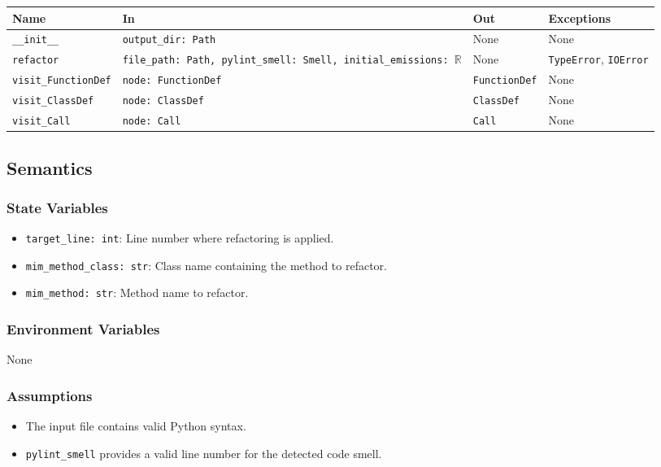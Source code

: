 \documentclass[12pt, titlepage]{article}
\begin{document}
\begin{tabularx}{\linewidth}{|l|>{\raggedright\arraybackslash}X|l|l|}
  \toprule Name & In & Out & Exceptions \\
  \midrule
  \texttt{\_\_init\_\_} & \texttt{output\_dir: Path} & None & None \\
  \hline
  \texttt{refactor} & \texttt{file\_path: Path, pylint\_smell: Smell, initial\_emissions: $\mathbb{R}$} & None & \texttt{TypeError}, \texttt{IOError} \\
  \hline
  \texttt{visit\_FunctionDef} & \texttt{node: FunctionDef} & \texttt{FunctionDef} & None \\
  \hline
  \texttt{visit\_ClassDef} & \texttt{node: ClassDef} & \texttt{ClassDef} & None \\
  \hline
  \texttt{visit\_Call} & \texttt{node: Call} & \texttt{Call} & None \\
  \bottomrule
\end{tabularx}
  
\subsection{Semantics}
  
\subsubsection{State Variables}
\begin{itemize}
  \item \texttt{target\_line: int}: Line number where refactoring is applied.
  \item \texttt{mim\_method\_class: str}: Class name containing the method to refactor.
  \item \texttt{mim\_method: str}: Method name to refactor.
\end{itemize}
  
\subsubsection{Environment Variables}
None
  
\subsubsection{Assumptions}
\begin{itemize}
  \item The input file contains valid Python syntax.
  \item \texttt{pylint\_smell} provides a valid line number for the detected code smell.
\end{itemize}
  
\end{document}
